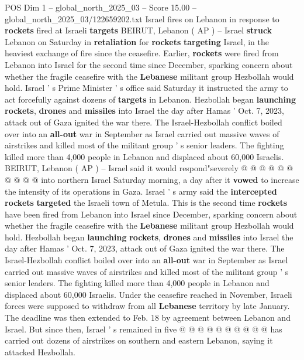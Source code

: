\begin{textsample}{POS Dim 1 – global\_north\_2025\_03 – Score 15.00 – global\_north\_2025\_03/122659202.txt}  \label{ex:f1_pos_430}
Israel fires on Lebanon in response to \textbf{rockets} fired at Israeli \textbf{targets} BEIRUT, Lebanon ( AP ) -- Israel \textbf{struck} Lebanon on Saturday in \textbf{retaliation} for \textbf{rockets} \textbf{targeting} Israel, in the heaviest exchange of fire since the ceasefire.
Earlier, \textbf{rockets} were fired from Lebanon into Israel for the second time since December, sparking concern about whether the fragile ceasefire with the \textbf{Lebanese} militant group Hezbollah would hold.
Israel ' s Prime Minister ' s office said Saturday it instructed the army to act forcefully against dozens of \textbf{targets} in Lebanon.
Hezbollah began \textbf{launching} \textbf{rockets}, \textbf{drones} and \textbf{missiles} into Israel the day after Hamas ' Oct. 7, 2023, attack out of Gaza ignited the war there.
The Israel-Hezbollah conflict boiled over into an \textbf{all-out} war in September as Israel carried out massive waves of airstrikes and killed most of the militant group ' s senior leaders.
The fighting killed more than 4,000 people in Lebanon and displaced about 60,000 Israelis.
BEIRUT, Lebanon ( AP ) -- Israel said it would respond"severely @ @ @ @ @ @ @ @ @ @ into northern Israel Saturday morning, a day after it \textbf{vowed} to increase the intensity of its operations in Gaza.
Israel ' s army said the \textbf{intercepted} \textbf{rockets} \textbf{targeted} the Israeli town of Metula.
This is the second time \textbf{rockets} have been fired from Lebanon into Israel since December, sparking concern about whether the fragile ceasefire with the \textbf{Lebanese} militant group Hezbollah would hold.
Hezbollah began \textbf{launching} \textbf{rockets}, \textbf{drones} and \textbf{missiles} into Israel the day after Hamas ' Oct. 7, 2023, attack out of Gaza ignited the war there.
The Israel-Hezbollah conflict boiled over into an \textbf{all-out} war in September as Israel carried out massive waves of airstrikes and killed most of the militant group ' s senior leaders.
The fighting killed more than 4,000 people in Lebanon and displaced about 60,000 Israelis.
Under the ceasefire reached in November, Israeli forces were supposed to withdraw from all \textbf{Lebanese} territory by late January.
The deadline was then extended to Feb. 18 by agreement between Lebanon and Israel.
But since then, Israel ' s remained in five @ @ @ @ @ @ @ @ @ @ has carried out dozens of airstrikes on southern and eastern Lebanon, saying it attacked Hezbollah.

\end{textsample}
